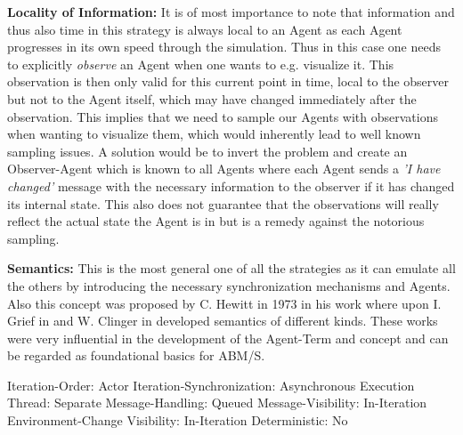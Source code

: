 \textbf{Locality of Information:} It is of most importance to note that information and thus also time in this strategy is always local to an Agent as each Agent progresses in its own speed through the simulation. Thus in this case one needs to explicitly \textit{observe} an Agent when one wants to e.g. visualize it. This observation is then only valid for this current point in time, local to the observer but not to the Agent itself, which may have changed immediately after the observation. This implies that we need to sample our Agents with observations when wanting to visualize them, which would inherently lead to well known sampling issues. A solution would be to invert the problem and create an Observer-Agent which is known to all Agents where each Agent sends a \textit{'I have changed'} message with the necessary information to the observer if it has changed its internal state. This also does not guarantee that the observations will really reflect the actual state the Agent is in but is a remedy against the notorious sampling. 

\textbf{Semantics:} This is the most general one of all the strategies as it can emulate all the others by introducing the necessary synchronization mechanisms and Agents. Also this concept was proposed by C. Hewitt in 1973 in his work \cite{hewitt_universal_1973} where upon I. Grief in \cite{grief_semantics_1975} and W. Clinger in \cite{clinger_foundations_1981} developed semantics of different kinds. These works were very influential in the development of the Agent-Term and concept and can be regarded as foundational basics for ABM/S.

	Iteration-Order:			Actor
	Iteration-Synchronization: 	Asynchronous
	Execution Thread:			Separate
 	Message-Handling:			Queued
 	Message-Visibility:			In-Iteration
 	Environment-Change Visibility:		In-Iteration
 	Deterministic:				No
